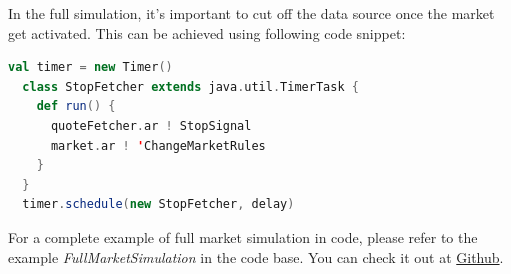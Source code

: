 In the full simulation, it's important to cut off the data source once the market get activated. This can be achieved using following code snippet:

\begin{lstlisting}[language=Scala]
  val timer = new Timer()
  class StopFetcher extends java.util.TimerTask {
    def run() {
      quoteFetcher.ar ! StopSignal
      market.ar ! 'ChangeMarketRules
    }
  }
  timer.schedule(new StopFetcher, delay)
\end{lstlisting}

For a complete example of full market simulation in code, please refer to the example \emph{FullMarketSimulation} in the code base. You can check it out at \href{https://github.com/merlinND/TradingSimulation/blob/master/ts/src/main/scala/ch/epfl/ts/example/FullMarketSimulation.scala}{Github}.
